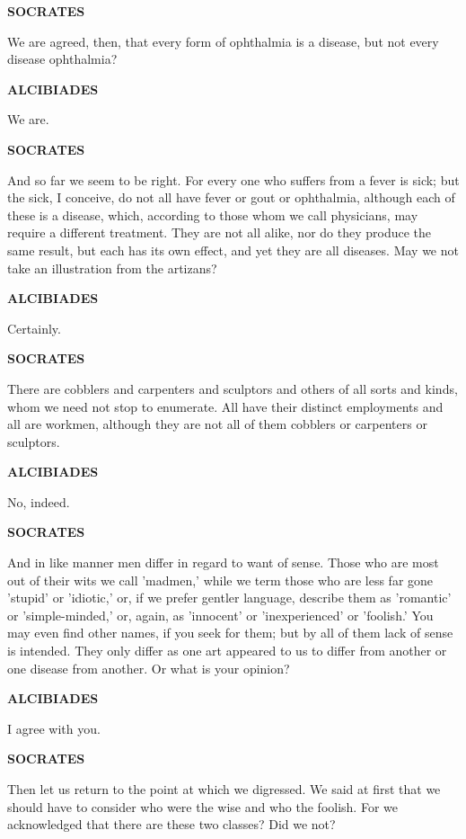\documentclass[11pt,letter]{article}
\begin{document}
\par \textbf{SOCRATES}
\par   We are agreed, then, that every form of ophthalmia is a disease, but not every disease ophthalmia?

\par \textbf{ALCIBIADES}
\par   We are.

\par \textbf{SOCRATES}
\par   And so far we seem to be right. For every one who suffers from a fever is sick; but the sick, I conceive, do not all have fever or gout or ophthalmia, although each of these is a disease, which, according to those whom we call physicians, may require a different treatment. They are not all alike, nor do they produce the same result, but each has its own effect, and yet they are all diseases. May we not take an illustration from the artizans?

\par \textbf{ALCIBIADES}
\par   Certainly.

\par \textbf{SOCRATES}
\par   There are cobblers and carpenters and sculptors and others of all sorts and kinds, whom we need not stop to enumerate. All have their distinct employments and all are workmen, although they are not all of them cobblers or carpenters or sculptors.

\par \textbf{ALCIBIADES}
\par   No, indeed.

\par \textbf{SOCRATES}
\par   And in like manner men differ in regard to want of sense. Those who are most out of their wits we call 'madmen,' while we term those who are less far gone 'stupid' or 'idiotic,' or, if we prefer gentler language, describe them as 'romantic' or 'simple-minded,' or, again, as 'innocent' or 'inexperienced' or 'foolish.' You may even find other names, if you seek for them; but by all of them lack of sense is intended. They only differ as one art appeared to us to differ from another or one disease from another. Or what is your opinion?

\par \textbf{ALCIBIADES}
\par   I agree with you.

\par \textbf{SOCRATES}
\par   Then let us return to the point at which we digressed. We said at first that we should have to consider who were the wise and who the foolish. For we acknowledged that there are these two classes? Did we not?
\end{document}
